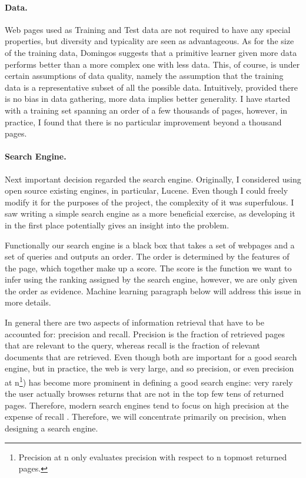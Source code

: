 \documentclass[12pt,twoside,notitlepage]{report}
\begin{document}
\paragraph{Data.}

Web pages used as Training and Test data are not required to have any special
properties, but diversity and typicality are seen as advantageous. As for the
size of the training data, Domingos \cite{domingos} suggests that a primitive
learner given more data performs better than a more complex one with less data.
This, of course, is under certain assumptions of data quality, namely the
assumption that the training data is a representative subset of all the
possible data. Intuitively, provided there is no bias in data gathering, more
data implies better generality. I have started with a training set spanning an
order of a few thousands of pages, however, in practice, I found that there is
no particular improvement beyond a thousand pages. 

\paragraph{Search Engine.}

Next important decision regarded the search engine.  Originally, I considered
using open source existing engines, in particular, Lucene. Even though I could
freely modify it for the purposes of the project, the complexity of it was
superfulous. I saw writing a simple search engine as a more beneficial
exercise, as developing it in the first place potentially gives an insight into
the problem.

Functionally our search engine is a black box that takes a set of webpages and
a set of queries and outputs an order. The order is determined by the features
of the page, which together make up a score. The score is the
function we want to infer using the ranking assigned by the search engine,
however, we are only given the order as evidence. Machine learning paragraph
below will address this issue in more details.

In general there are two aspects of information retrieval that have to be
accounted for: precision and recall. Precision is the fraction of retrieved pages that
are relevant to the query, whereas recall is the fraction of relevant
documents that are retrieved. Even though both are important for a good search
engine, but in practice, the web is very large, and so precision, or even
precision at n\footnote{Precision at n only evaluates precision with respect to
n topmost returned pages.}) has become
more prominent in defining a good search engine: very rarely the user actually
browses returns that are not in the top few tens of returned pages. Therefore, 
modern search engines tend to focus on high precision at the expense of recall
\cite{GOOGLE}. Therefore, we will concentrate primarily on precision, when
designing a search engine.
\end{document}

